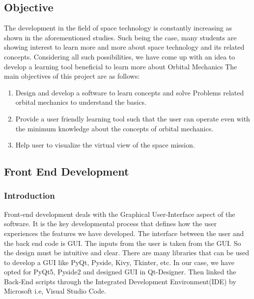 \subsection{Objective}
The development in the field of space technology is constantly increasing as shown in the aforementioned studies.
Such being the case, many students are showing interest to learn more and more about space technology and its related concepts. Considering all such possibilities, we have come up with an idea to develop a learning tool beneficial to learn more about Orbital Mechanics 
The main objectives of this project are as follows:
\begin{enumerate}
\item Design and develop a software to learn concepts and  solve Problems related orbital mechanics to understand the basics.
\item Provide a user friendly learning tool such that the user can operate even with the minimum knowledge about the concepts of orbital mechanics.
\item Help user to visualize the virtual view of the space mission.
\end{enumerate}
\subsection{Front End Development}
\subsubsection{Introduction}
Front-end development deals with the Graphical User-Interface aspect of the software. It is the key developmental process that defines how the user experiences the features we have developed. The interface between the user and the back end code is GUI. The inputs from the user is taken from the GUI. So the design must be intuitive and clear. There are many libraries that can be used to develop a GUI like PyQt, Pyside, Kivy, Tkinter, etc. In our case, we have opted for PyQt5, Pyside2 and designed GUI in Qt-Designer. Then linked the Back-End scripts through the Integrated Development Environment(IDE) by Microsoft i.e, Visual Studio Code.
